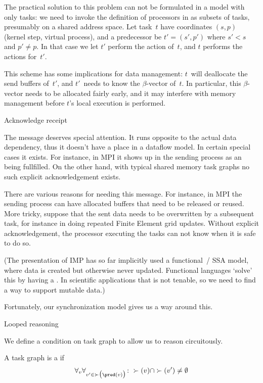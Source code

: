 The practical solution to this problem can not be formulated in a model
with only tasks: we need to invoke the definition of processors in 
as subsets of tasks, presumably on a shared address space.
Let task~$t$ have coordinates $(s,p)$ (kernel step, virtual process),
and a predecessor be $t'=(s',p')$ where $s'<s$ and $p'\not=p$.
In that case we let $t'$ perform the 
action of~$t$, and $t$ performs the 
actions for~$t'$.

This scheme has some implications for data management: $t$~will deallocate
the send buffers of~$t'$, and $t'$~needs to know the $\beta$-vector of~$t$.
In particular, this $\beta$-vector needs to be allocated fairly early,
and it may interfere with memory management before $t$'s local execution
is performed.

 {Acknowledge receipt}
\label{sec:ack-msg}

The  message deserves special attention.
It runs opposite to the actual data dependency, thus it
doesn't have a place in a dataflow model. In certain special 
cases it exists. For instance, in MPI it shows up in 
the sending process as an  being fullfilled.
On the other hand, with typical shared memory task graphs
no such explicit acknowledgement exists.

There are various reasons for needing this message.
For instance, in MPI the sending process can have allocated
buffers that need to be released or reused.
More tricky, suppose that the sent data needs to be overwritten
by a subsequent task, for instance in doing repeated Finite Element
grid updates. Without explicit acknowledgement, the processor
executing the tasks can not know when it is safe to do so.

(The presentation of \ac{IMP} has so far implicitly used
a functional~/ \ac{SSA} model, where data is created
but otherwise never updated. Functional languages
`solve' this by having a .
In scientific applications
that is not tenable, so we need to find a way to support
mutable data.)

Fortunately, our synchronization model gives us a way around this.

 {Looped reasoning}

We define a condition on task graph to allow us to reason
circuitously.

\begin{definition}
  A task graph is a  if
  \begin{equation}
    \forall_v\forall_{v'\in\succ\bigl(\pred(v)\bigr)}\colon
    \succ(v)\cap\succ(v')\not=\emptyset
    \label{eq:loopdef}
  \end{equation}
\end{definition}

